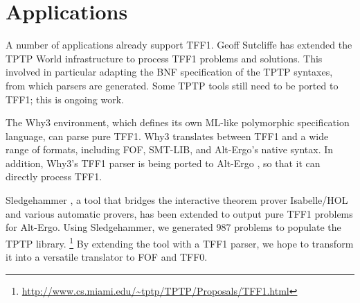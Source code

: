 \section{Applications}
\label{sec_apps}

A number of applications already support TFF1. Geoff
Sutcliffe has extended the TPTP World infrastructure to process TFF1 problems
and solutions. This involved in particular adapting the BNF specification of the
TPTP syntaxes, from which parsers are generated. Some TPTP tools still need to be
ported to TFF1; this is ongoing work.

The Why3 \cite{bobot-et-al-2011} environment, which defines its own ML-like
polymorphic specification language, can parse pure TFF1. Why3 translates
between TFF1 and a wide range of
formats, including FOF, SMT-LIB, and
Alt-Ergo's native syntax. In addition, Why3's TFF1 parser is being ported to
Alt-Ergo \cite{bobot-et-al-2008}, so that it can directly process TFF1. %

Sledgehammer \cite{paulson-blanchette-2010}, a tool that bridges the interactive
theorem prover Isabelle\slash HOL and various automatic provers, has been
extended to output pure TFF1 problems for Alt-Ergo. Using Sledgehammer, we
generated 987 problems to populate the TPTP library.%
\footnote{\url{http://www.cs.miami.edu/~tptp/TPTP/Proposals/TFF1.html}}
By extending the tool with a TFF1 parser,
we hope to transform it into a versatile translator to FOF and
TFF0.



